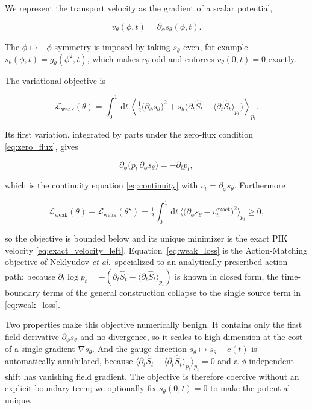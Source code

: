 \documentclass[reprint,twocolumn,superscriptaddress,preprintnumbers,amsmath,amssymb,aps,prd,floatfix]{revtex4-2}
\newcommand{\dd}{\,\mathrm{d}}
\begin{document}
We represent the transport velocity as the gradient of a scalar potential,

\begin{equation}
 v_\theta(\phi,t)=\partial_\phi s_\theta(\phi,t).
 \label{eq:potential_velocity}
\end{equation}

The $\phi\mapsto-\phi$ symmetry is imposed by taking $s_\theta$ even, for example
$s_\theta(\phi,t)=g_\theta(\phi^2,t)$, which makes $v_\theta$ odd and enforces
$v_\theta(0,t)=0$ exactly.

The variational objective is

\begin{equation}
 \mathcal{L}_{\mathrm{weak}}(\theta)
 =
 \int_0^1\!\dd t\,
 \left\langle
 \tfrac12\bigl(\partial_\phi s_\theta\bigr)^2
 +
 s_\theta\bigl(\partial_t\hat S_t-\langle\partial_t\hat S_t\rangle_{p_t}\bigr)
 \right\rangle_{p_t}.
 \label{eq:weak_loss}
\end{equation}

Its first variation, integrated by parts under the zero-flux condition
\eqref{eq:zero_flux}, gives

\begin{equation}
 \partial_\phi\bigl(p_t\,\partial_\phi s_\theta\bigr)=-\partial_t p_t,
 \label{eq:weak_euler_lagrange}
\end{equation}

which is the continuity equation \eqref{eq:continuity} with
$v_t=\partial_\phi s_\theta$. Furthermore

\begin{equation}
 \mathcal{L}_{\mathrm{weak}}(\theta)-\mathcal{L}_{\mathrm{weak}}(\theta^\star)
 =
 \tfrac12\int_0^1\!\dd t\,
 \bigl\langle\bigl(\partial_\phi s_\theta-v_t^{\mathrm{exact}}\bigr)^2\bigr\rangle_{p_t}
 \ge 0,
 \label{eq:weak_lower_bound}
\end{equation}

so the objective is bounded below and its unique minimizer is the exact PIK
velocity \eqref{eq:exact_velocity_left}. Equation~\eqref{eq:weak_loss} is the
Action-Matching objective of Neklyudov \textit{et al.}\ specialized to an
analytically prescribed action path: because
$\partial_t\log p_t=-(\partial_t\hat S_t-\langle\partial_t\hat S_t\rangle_{p_t})$
is known in closed form, the time-boundary terms of the general construction
collapse to the single source term in \eqref{eq:weak_loss}.

Two properties make this objective numerically benign. It contains only the first
field derivative $\partial_\phi s_\theta$ and no divergence, so it scales to high
dimension at the cost of a single gradient $\nabla s_\theta$. And the gauge
direction $s_\theta\mapsto s_\theta+c(t)$ is automatically annihilated, because
$\langle\partial_t\hat S_t-\langle\partial_t\hat S_t\rangle_{p_t}\rangle_{p_t}=0$
and a $\phi$-independent shift has vanishing field gradient. The objective is
therefore coercive without an explicit boundary term; we optionally fix
$s_\theta(0,t)=0$ to make the potential unique.
\end{document}
